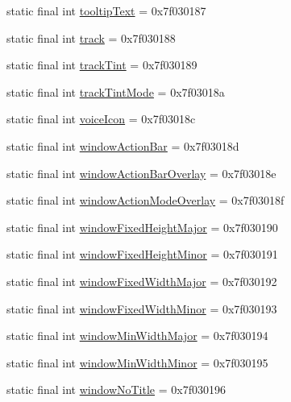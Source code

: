 \begin{DoxyCompactItemize}
\item 
static final int \mbox{\hyperlink{classandroid_1_1support_1_1v7_1_1appcompat_1_1R_1_1attr_a19ea8abe4cfe04fbdbb0d642bc045ce6}{tooltip\+Text}} = 0x7f030187
\item 
static final int \mbox{\hyperlink{classandroid_1_1support_1_1v7_1_1appcompat_1_1R_1_1attr_accde29fd93475195158a6087ebeb2bb1}{track}} = 0x7f030188
\item 
static final int \mbox{\hyperlink{classandroid_1_1support_1_1v7_1_1appcompat_1_1R_1_1attr_a9027c6a1857ce71f9769073110c6abfc}{track\+Tint}} = 0x7f030189
\item 
static final int \mbox{\hyperlink{classandroid_1_1support_1_1v7_1_1appcompat_1_1R_1_1attr_a253097e6cf2e7eff229a8da50651fef9}{track\+Tint\+Mode}} = 0x7f03018a
\item 
static final int \mbox{\hyperlink{classandroid_1_1support_1_1v7_1_1appcompat_1_1R_1_1attr_a60eb48eb37059ce1df644b731021b9a8}{voice\+Icon}} = 0x7f03018c
\item 
static final int \mbox{\hyperlink{classandroid_1_1support_1_1v7_1_1appcompat_1_1R_1_1attr_a2bc5a3ef0bedb9e38e1741a20948be3f}{window\+Action\+Bar}} = 0x7f03018d
\item 
static final int \mbox{\hyperlink{classandroid_1_1support_1_1v7_1_1appcompat_1_1R_1_1attr_a5fc5e9a4b069a9b599610b2c4f5c662a}{window\+Action\+Bar\+Overlay}} = 0x7f03018e
\item 
static final int \mbox{\hyperlink{classandroid_1_1support_1_1v7_1_1appcompat_1_1R_1_1attr_a9f2e4cf261c9c52bb72af80cde2502ec}{window\+Action\+Mode\+Overlay}} = 0x7f03018f
\item 
static final int \mbox{\hyperlink{classandroid_1_1support_1_1v7_1_1appcompat_1_1R_1_1attr_a86de19f224da4a883392022e0497452a}{window\+Fixed\+Height\+Major}} = 0x7f030190
\item 
static final int \mbox{\hyperlink{classandroid_1_1support_1_1v7_1_1appcompat_1_1R_1_1attr_ac628c4041d17414ef198ce6f0364281a}{window\+Fixed\+Height\+Minor}} = 0x7f030191
\item 
static final int \mbox{\hyperlink{classandroid_1_1support_1_1v7_1_1appcompat_1_1R_1_1attr_abb30020191b06391ce2c973b999e985a}{window\+Fixed\+Width\+Major}} = 0x7f030192
\item 
static final int \mbox{\hyperlink{classandroid_1_1support_1_1v7_1_1appcompat_1_1R_1_1attr_aac53966a3b02d97f423d030e692e39fa}{window\+Fixed\+Width\+Minor}} = 0x7f030193
\item 
static final int \mbox{\hyperlink{classandroid_1_1support_1_1v7_1_1appcompat_1_1R_1_1attr_a97b91d010aba26efc51cf5abef9717e1}{window\+Min\+Width\+Major}} = 0x7f030194
\item 
static final int \mbox{\hyperlink{classandroid_1_1support_1_1v7_1_1appcompat_1_1R_1_1attr_a42559736432f294a82fae05e842c36f6}{window\+Min\+Width\+Minor}} = 0x7f030195
\item 
static final int \mbox{\hyperlink{classandroid_1_1support_1_1v7_1_1appcompat_1_1R_1_1attr_a46ea84cd8ac398f0d99f1ff7f0e2d100}{window\+No\+Title}} = 0x7f030196
\end{DoxyCompactItemize}


